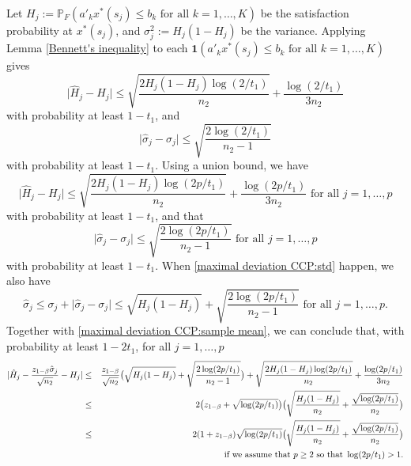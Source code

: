 \documentclass[mnsc,blindrev]{informs4} %
\begin{document}
Let $H_j:=\mathbb P_F(a'_kx^*(s_j)\leq b_k\text{ for all }k=1,\ldots,K)$ be the satisfaction probability at $x^*(s_j)$, and $\sigma^2_j:=H_j(1-H_j)$ be the variance. Applying Lemma \ref{Bennett's inequality} to each $\mathbf{1}(a'_kx^*(s_j)\leq b_k\text{ for all }k=1,\ldots,K)$ gives
\begin{equation*}
    \lvert \hat H_j-H_j\rvert\leq \sqrt{\frac{2H_j(1-H_j)\log(2/t_1)}{n_2}}+\frac{\log(2/t_1)}{3n_2}
\end{equation*}
with probability at least $1-t_1$, and
\begin{equation*}
    \lvert \hat\sigma_j-\sigma_j\rvert\leq \sqrt{\frac{2\log(2/t_1)}{n_2-1}}
\end{equation*}
with probability at least $1-t_1$. Using a union bound, we have
\begin{equation}\label{maximal deviation CCP:sample mean}
    \lvert \hat H_j-H_j\rvert\leq \sqrt{\frac{2H_j(1-H_j)\log(2p/t_1)}{n_2}}+\frac{\log(2p/t_1)}{3n_2}\text{ for all }j=1,\ldots,p
\end{equation}
with probability at least $1-t_1$, and that
\begin{equation}\label{maximal deviation CCP:std}
    \lvert \hat\sigma_j-\sigma_j\rvert\leq \sqrt{\frac{2\log(2p/t_1)}{n_2-1}}\text{ for all }j=1,\ldots,p
\end{equation}
with probability at least $1-t_1$. When \eqref{maximal deviation CCP:std} happen, we also have
\begin{equation*}
    \hat\sigma_j\leq \sigma_j+\lvert \hat\sigma_j-\sigma_j\rvert\leq \sqrt{H_j(1-H_j)}+\sqrt{\frac{2\log(2p/t_1)}{n_2-1}}\text{ for all }j=1,\ldots,p.
\end{equation*}
Together with \eqref{maximal deviation CCP:sample mean}, we can conclude that, with probability at least $1-2t_1$, for all $j=1,\ldots,p$
\begin{eqnarray}
    \notag\lvert \hat H_j-\frac{z_{1-\beta}\hat\sigma_j}{\sqrt{n_2}}-H_j\rvert&\leq& \frac{z_{1-\beta}}{\sqrt{n_2}} \big(\sqrt{H_j(1-H_j)}+\sqrt{\frac{2\log(2p/t_1)}{n_2-1}}\big)+\sqrt{\frac{2H_j(1-H_j)\log(2p/t_1)}{n_2}}+\frac{\log(2p/t_1)}{3n_2}\\
    \notag&\leq& 2\big(z_{1-\beta}+\sqrt{\log (2p/t_1)}\big)\big(\sqrt{\frac{H_j(1-H_j)}{n_2}}+\frac{\sqrt{\log (2p/t_1)}}{n_2}\big)\\
    &\leq& 2(1+z_{1-\beta})\sqrt{\log (2p/t_1)}\big(\sqrt{\frac{H_j(1-H_j)}{n_2}}+\frac{\sqrt{\log (2p/t_1)}}{n_2}\big)\label{maximal deviation CCP:sample mean adjusted by std}\\
    \notag&&\text{\ \ if we assume that }p\geq 2\text{ so that }\log (2p/t_1)>1.
\end{eqnarray}
\end{document}
